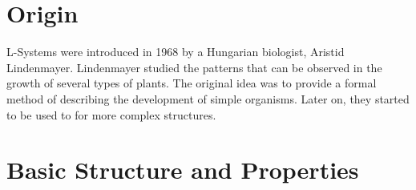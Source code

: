 \documentclass{acmtog}
\begin{document}
\begin{abstract}
[Abstact here]
\end{abstract}


\section{Origin}
\label{sec:origin}

L-Systems were introduced in 1968 by a Hungarian biologist, Aristid Lindenmayer. Lindenmayer studied the patterns that can be observed in the growth of several types of plants. The original idea was to provide a formal method of describing the development of simple organisms. Later on, they started to be used to for more complex structures.




\section{Basic Structure and Properties}
\label{sec:basicstruct}
\end{document}
